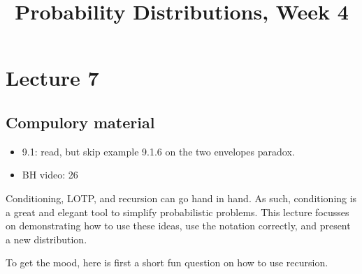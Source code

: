 


\title{Probability Distributions, Week 4}


\maketitle
\toccontents

\section{Lecture 7}
\label{sec:lecture-1}


\subsection{Compulory material}
\label{sec:compulory-material}

\begin{itemize}
\item 9.1: read, but skip example 9.1.6 on the two envelopes paradox.
\item BH video: 26
\end{itemize}




Conditioning, LOTP, and recursion can go hand in hand. As such, conditioning is a great and elegant tool to simplify probabilistic problems. This lecture focusses on demonstrating how to use these ideas, use the notation correctly, and present a new distribution.

To get the mood, here is first a short fun question on how to use recursion.

